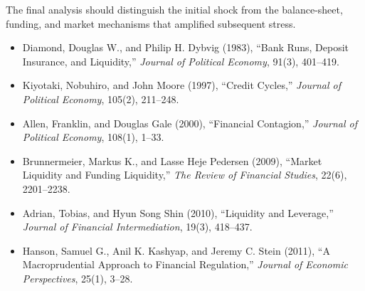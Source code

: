The final analysis should distinguish the initial shock from the balance-sheet, funding, and market mechanisms that amplified subsequent stress.




\begin{itemize}

\item Diamond, Douglas W., and Philip H. Dybvig (1983),
``Bank Runs, Deposit Insurance, and Liquidity,''
\emph{Journal of Political Economy}, 91(3), 401--419.

\item Kiyotaki, Nobuhiro, and John Moore (1997),
``Credit Cycles,''
\emph{Journal of Political Economy}, 105(2), 211--248.

\item Allen, Franklin, and Douglas Gale (2000),
``Financial Contagion,''
\emph{Journal of Political Economy}, 108(1), 1--33.

\item Brunnermeier, Markus K., and Lasse Heje Pedersen (2009),
``Market Liquidity and Funding Liquidity,''
\emph{The Review of Financial Studies}, 22(6), 2201--2238.

\item Adrian, Tobias, and Hyun Song Shin (2010),
``Liquidity and Leverage,''
\emph{Journal of Financial Intermediation}, 19(3), 418--437.

\item Hanson, Samuel G., Anil K. Kashyap, and Jeremy C. Stein (2011),
``A Macroprudential Approach to Financial Regulation,''
\emph{Journal of Economic Perspectives}, 25(1), 3--28.

\end{itemize}


